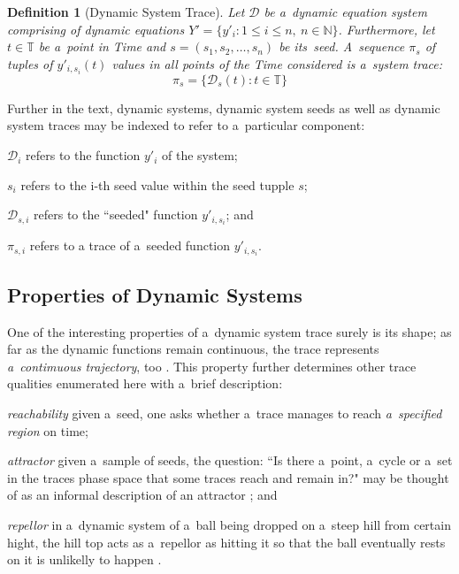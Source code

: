 \documentclass[12pt,oneside,draft]{fithesis}
\newcommand{\mD}{\mathcal{D}}
\newcommand{\mNatural}{\mathbb{N}}
\newcommand{\mTime}{\mathbb{T}}
\newtheorem{mydef}{Definition}
\begin{document}
\begin{mydef}[Dynamic System Trace]
Let $\mD$ be a~dynamic equation system comprising of dynamic equations
$Y'=\{y'_i:1\leq{}i\leq{}n,\:n\in\mNatural\}$. Furthermore, let
$t\in\mTime$ be a~point in Time and $s=(s_1,s_2,\dotsc,s_n)$ be
its~seed. A~sequence $\pi_s$ of tuples of $y'_{i,s_i}(t)$ values in all
points of the Time considered is a~system trace:
	\begin{equation}
		\pi_s=\{\mD_s{}(t): t\in\mTime\}
	\end{equation}
\end{mydef}

Further in the text, dynamic systems, dynamic system seeds as well as
dynamic system traces may be indexed to refer to a~particular component:
\begin{inparaenum}
	\item $\mD_i$ refers to the function $y'_i$ of the system;
	\item $s_i$ refers to the i-th seed value within the seed tupple
		$s$;
	\item $\mD_{s,i}$ refers to the ``seeded" function $y'_{i,s_i}$; and
	\item $\pi_{s,i}$ refers to a trace of a~seeded function
		$y'_{i,s_i}$.
\end{inparaenum}

\subsection{Properties of Dynamic Systems}
One of the interesting properties of a~dynamic system trace
surely is its shape; as far as the dynamic functions remain continuous,
the trace represents \emph{a~contimuous trajectory}, too \cite{sven}.
This property further determines other trace qualities enumerated here
with a~brief description:
\begin{inparaenum}
	\item\emph{reachability} given a~seed, one asks whether a~trace
		manages to reach \emph{a~specified region} on time;
	\item\emph{attractor} given a~sample of seeds, the question:
		``Is there a~point, a~cycle or a~set in the traces phase space
		that some traces reach and remain in?" may be thought of as an
		informal description of an attractor \cite{wiki-atractor}; and
	\item\emph{repellor} in a~dynamic system of a~ball being dropped on
		a~steep hill from certain hight, the hill top acts as a~repellor
		as hitting it so that the ball eventually rests on it is
		unlikelly to happen \cite{wiki-repellor}.
\end{inparaenum}
\end{document}
